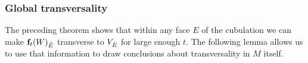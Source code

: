 \begin{comment}

	AROUND HERE IS WHERE THINGS STILL NEED TO BE FIXED UP.

	Similarly, consider a $\zeta > 0$ small enough so that the closed $L^\infty$ neighborhood $\overline N_\zeta(F^-)$ of $F^-$ is such that either $W_E \cap \overline N_\zeta(F^-) = \emptyset$ or for any $x \in W_E \cap \overline N_\zeta(F^-)$ the affine space $T_xW_E$ is transverse to the span of $\beta_{F^-} = \{\e_i\ |\ i \in F^-_{01}\}$ at $x$.
	In the latter case, for every such $x$, the transversality implies that $T_xW_E$ projects surjectively onto $F$; in other words, the projection of $W_E \cap \overline N_\zeta(F^-)$ to $F$ is a submersion onto its image.
	Therefore, we may choose continuously with $x$ a subset of $T_xW_E$ of the form $\beta_x = \{\e_j + v_j\ |\ j \in F_{01}\}$ such that $v_j$ is in the span of $\beta_{F^-}$.
	As $W_E \cap \overline N_\zeta(F^-)$ is compact, the $v_j$ have bounded norm.

	By possibly making $\delta$ smaller we can choose $u \in (0, 1)$ by inductive hypothesis such that $\overline N_\delta(F) \setminus \overline N_\delta L_u(F)$ is contained in $\mathcal N^{i-1}$.

	By \cref{L:flow to initial and terminal faces} we may choose $t > T^{i-1}$ sufficiently large so that all points in $\f_t(W_E) \cap V_E \cap \overline N_\delta L_u(F)$ are of the form $y = \f_t(x)$ for some $x \in W_E \cap \overline N_\zeta(F^-)$.

	We use \cref{L:jacobian ratios} to deduce that the push forward of the span of $\beta_x$ along $D\,\f_t$ is as close as desired to the span of $\beta_F$ at $y$ and is therefore transverse to $T_y V_E$.
	The induction step is completed by taking $\mathcal N^i$ to be the union over all terminal faces of $N_\delta(F)$ and $T^i$ the maximum value of their associated $t$.

	\end{comment}


\subsubsection{Global transversality}
The preceding theorem shows that within any face $E$ of the cubulation we can make $\mathbf{f}_t(W)_{\mathring{E}}$ transverse to $V_{\mathring{E}}$ for large enough $t$.
The following lemma allows us to use that information to draw conclusions about transversality in $M$ itself.


